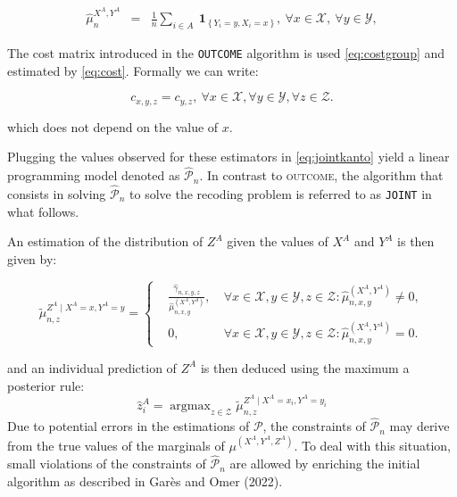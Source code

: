 \begin{equation}
     \begin{aligned}
         \hat{\mu}^{X^A,Y^A}_{n} & = & \frac{1}{n}\sum_{i\in A} ~\mathbf{1}_{\left\{Y_i = y,X_i = x\right\}}, \:\forall x\in\mathcal{X}, \: \forall y\in\mathcal{Y},
     \end{aligned}
     \label{eq:estimatoutcov}
 \end{equation}

The cost matrix introduced in the \texttt{OUTCOME} algorithm is used \eqref{eq:costgroup} and estimated by \eqref{eq:cost}. Formally we can write:

\begin{equation} 
  c_{x,y,z} = c_{y,z}, \:\forall x\in\mathcal{X},\forall y\in\mathcal{Y},\forall z\in\mathcal{Z}.
  \label{eq:truecostjoint}
\end{equation}

\noindent which does not depend on the value of \(x\).

Plugging the values observed for these estimators in \eqref{eq:jointkanto} yield a linear programming model denoted as \(\widehat{\mathcal{P}}_n\). In contrast to \textsc{outcome}, the algorithm that consists in solving \(\widehat{\mathcal{P}}_n\) to solve the recoding problem is referred to as \texttt{JOINT} in what follows.

An estimation of the distribution of \(Z^A\) given the values of \(X^A\) and \(Y^A\) is then given by:

\begin{equation}
 \tilde{\mu}^{Z^A\mid X^A=x,Y^A=y}_{n,z}=
 \left\{\begin{aligned}
 &\frac{\hat{\gamma}_{n,x,y,z}}{\hat{\mu}^{(X^A,Y^A)}_{n,x,y}}, & \:\forall x\in\mathcal{X},y\in\mathcal{Y},z\in\mathcal{Z}: \hat{\mu}^{(X^A,Y^A)}_{n,x,y}\neq 0,\\
 &0, & \:\forall x\in\mathcal{X},y\in\mathcal{Y},z\in\mathcal{Z}: \hat{\mu}^{(X^A,Y^A)}_{n,x,y}= 0.
 \end{aligned}\right.
\label{eq:condprob}
\end{equation}

and an individual prediction of \(Z^A\) is then deduced using the maximum a posterior rule:
\[
\widehat{z}_i^A= \operatorname{argmax}_{z\in\mathcal{Z}} \tilde{\mu}^{Z^A\mid X^A=x_i,Y^A=y_i}_{n,z}
\]
Due to potential errors in the estimations of \(\mathcal{P}\), the constraints of \(\widehat{\mathcal{P}}_n\) may derive from the true values of the marginals of \(\mu^{(X^A,Y^A,Z^A)}\). To deal with this situation, small violations of the constraints of \(\widehat{\mathcal{P}}_n\) are allowed by enriching the initial algorithm as described in Garès and Omer (2022).

